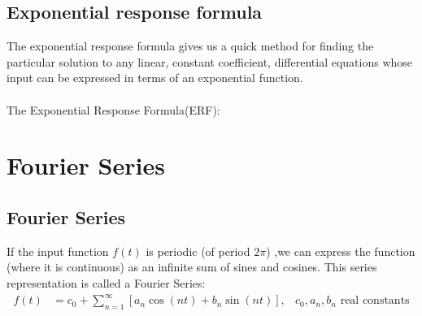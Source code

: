 \documentclass{report}
\begin{document}
\newpage

\subsection{Exponential response formula}
The exponential response formula gives us a quick method for finding the particular solution to 
any linear, constant coefficient, differential equations whose input can be expressed in terms
of an exponential function.\\
\vspace{2mm}\\
The Exponential Response Formula(ERF): 

\section{Fourier Series}
\subsection{Fourier Series}
If the input function $f(t)$ is periodic (of period $2\pi$)
,we can express the function (where it is continuous) as an
infinite sum of sines and cosines.
This series representation is called a Fourier Series:
\begin{align*}
f(t)&=c_0+\sum_{n=1}^{\infty}[a_n\cos(nt)+b_n\sin(nt)], 
& \text{$c_0, a_n, b_n$ real constants}
\end{align*}
\end{document}
